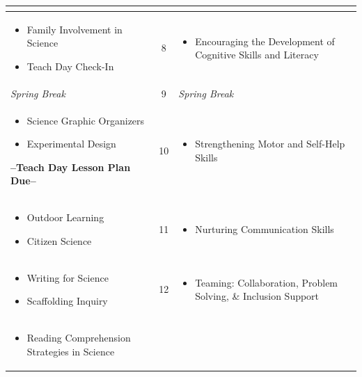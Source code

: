 \documentclass[11.5pt]{sig-alternate} %
\begin{document}
\begin{large}
\begin{table}[htbp]
\begin{tabular}{|l|c|l|}
\begin{itemize}[noitemsep, topsep=0pt]
\end{itemize} \\ \hline
\begin{itemize}[noitemsep, topsep=0pt]
    \item Family Involvement in Science
    \item Teach Day Check-In
\end{itemize} & 8 & \begin{itemize}[noitemsep, topsep=0pt]
    \item Encouraging the Development of Cognitive Skills and Literacy
\end{itemize} \\ \hline
\textit{Spring Break} & 9 & \textit{Spring Break} \\ \hline
\begin{itemize}[noitemsep, topsep=0pt]
    \item Science Graphic Organizers
    \item Experimental Design
\end{itemize} \textbf{--Teach Day Lesson Plan Due--} & 10 & \begin{itemize}[noitemsep, topsep=0pt]
    \item Strengthening Motor and Self-Help Skills
\end{itemize} \\ \hline
\begin{itemize}[noitemsep, topsep=0pt]
    \item Outdoor Learning
    \item Citizen Science
\end{itemize} & 11 & \begin{itemize}[noitemsep, topsep=0pt]
    \item Nurturing Communication Skills
\end{itemize} \\ \hline
\begin{itemize}[noitemsep, topsep=0pt]
    \item Writing for Science
    \item Scaffolding Inquiry
\end{itemize} & 12 & \begin{itemize}[noitemsep, topsep=0pt]
    \item Teaming: Collaboration, Problem Solving, \& Inclusion Support
\end{itemize} \\ \hline
\begin{itemize}[noitemsep, topsep=0pt]
    \item Reading Comprehension Strategies in Science

\end{itemize}
\end{tabular}
\end{table}
\end{large}
\end{document}
